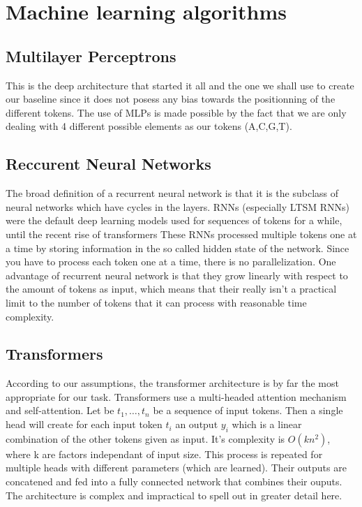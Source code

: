 \documentclass{article}
\begin{document}
\section*{Machine learning algorithms}
\subsection*{Multilayer Perceptrons}
This is the deep architecture that started it all 
and the one we shall use to create our baseline since it does 
not posess any bias towards the positionning of 
the different tokens. The use of MLPs is made possible by the fact 
that we are only dealing with 4 different possible elements as our tokens
(A,C,G,T).

\subsection*{Reccurent Neural Networks}
The broad definition of a recurrent neural network 
is that it is the subclass of neural networks \cite{lstms} which have cycles in the layers. 
RNNs (especially LTSM RNNs) were the default deep learning models used for sequences
of tokens for a while, until the recent rise of transformers 
These RNNs processed multiple tokens one at a time by storing information in the so called
hidden state of the network. Since you have to process each token one at 
a time, there is no parallelization. 
One advantage of recurrent neural network is that they grow 
linearly with respect to the amount of tokens as input, which means 
that their really isn't a practical limit to the number of tokens that
it can process with reasonable time complexity. 
\subsection*{Transformers}
According to our assumptions, the transformer 
architecture \cite{transformers} is by far the most appropriate
for our task. Transformers use a multi-headed 
attention mechanism and self-attention. Let
be $t_1, \dots, t_n$ be a sequence of input tokens. Then a single 
head will create for each input token $t_i$ an output $y_i$ which is a 
linear combination of the other tokens given as input. It's complexity
is $O(kn^2)$, where k are factors independant of input size. This process is 
repeated for multiple heads with different parameters (which are learned). Their
outputs are concatened and fed into a fully connected network that combines 
their ouputs. The architecture is complex and impractical to spell out
in greater detail here.
\end{document}
